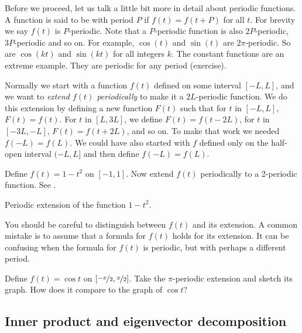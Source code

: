 Before we proceed, let us talk a little bit more in detail about
periodic functions.
A function is said to be \emph{} with period $P$ if
$f(t) = f(t+P)$ for all $t$.  For brevity we say $f(t)$ is $P$-periodic.
Note that a $P$-periodic function is also $2P$-periodic, $3P$-periodic
and so on.
For example, $\cos (t)$ and $\sin (t)$ are
$2\pi$-periodic.  So are $\cos (kt)$ and $\sin (kt)$ for all integers $k$.  The
constant functions are an extreme example.  They are periodic for any period
(exercise).

Normally we start with a function $f(t)$ defined on some interval $[-L,L]$,
and we want to
\emph{extend $f(t)$ periodically}
to make it
a $2L$-periodic function.  We do this extension
by defining a new function $F(t)$
such that for $t$ in $[-L,L]$, $F(t) = f(t)$.  For $t$ in $[L,3L]$,
we define $F(t) = f(t-2L)$, for $t$ in $[-3L,-L]$, $F(t) = f(t+2L)$, and
so on.
To make that work we needed $f(-L) = f(L)$.
We could have also started with $f$
defined only on the half-open interval $(-L,L]$ and then define $f(-L) = f(L)$.

\begin{example}
Define $f(t) = 1-t^2$ on $[-1,1]$.  Now extend $f(t)$ periodically to
a 2-periodic function.  See .
\begin{myfig}
\capstart
{}
\caption{Periodic extension of the function
$1-t^2$.\label{ts:perextofinvertedparabolafig}}
\end{myfig}
\end{example}

You should be careful to distinguish between $f(t)$ and its extension.  A common
mistake is to assume that a formula for $f(t)$ holds for its extension.  It
can be confusing when the formula for $f(t)$ is periodic, but with perhaps
a different period.

\begin{exercise}
Define $f(t) = \cos t$ on $[\nicefrac{-\pi}{2},\nicefrac{\pi}{2}]$.  Take the $\pi$-periodic
extension and sketch its graph.  How does it compare to the graph of
$\cos t$?
\end{exercise}

\subsection{Inner product and eigenvector decomposition}

